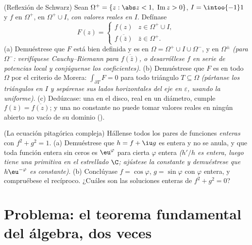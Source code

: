 \begin{exercise}[$\star\star\star$]\label{exo:b3:holomorphic:11}
(Reflexión de Schwarz) Sean $\Omega^+ = \{z : \abs z < 1,\
\operatorname{Im}z > 0\}$, $I = \intoo{-1}1$ y $f$
 en $\Omega^+$,
 en $\Omega^+\cup I$,
\emph{con valores reales en $I$}. Defínase
\[
F(z) = \begin{cases} f(z) & z \in \Omega^+\cup I,\\
\overline{f(\bar z)} & \bar z \in \Omega^+ . \end{cases}
\]
(a) Demuéstrese que $F$ está bien definida y es
 en
$\Omega = \Omega^+\cup I\cup\Omega^-$, y
 en $\Omega^\pm$ \emph{(para
$\Omega^-$: verifíquese Cauchy--Riemann para $\overline{f(\bar z)}$, o
desarróllese $f$ en serie de potencias local y conjúguense los
coeficientes)}. (b) Demuéstrese que $F$ es
 en todo $\Omega$ por el
criterio de Morera: $\int_{\partial T}F = 0$ para todo triángulo
$T \subseteq \Omega$ \emph{(pártanse los triángulos en $I$ y sepárense
sus lados horizontales del eje en $\varepsilon$, usando la
 uniforme)}. (c)
Dedúzcase: una  en el
disco, real en un diámetro, cumple $f(\bar z) = \overline{f(z)}$; y una
\omterm{def:b3:holomorphic:holo}{función holomorfa} no constante no
puede tomar valores reales en ningún abierto no vacío de su dominio
(\omterm{def:b3:topology:connected}{conexo}).
\end{exercise}

\begin{exercise}[$\star\star$]\label{exo:b3:holomorphic:12}
(La ecuación pitagórica compleja) Hállense todos los pares de funciones
\emph{enteras} con $f^2 + g^2 = 1$. (a) Demuéstrese que $h = f + \iu g$
es entera y no se anula, y que toda función entera sin ceros es
$\eu^{\varphi}$ para cierta $\varphi$ entera \emph{($h'/h$ es entera,
luego tiene una primitiva en el estrellado $\C$; ajústese la constante y
demuéstrese que $h\eu^{-\varphi}$ es constante)}. (b) Conclúyase
$f = \cos\varphi$, $g = \sin\varphi$ con $\varphi$ entera, y compruébese
el recíproco. ¿Cuáles son las soluciones enteras de $f^2 + g^2 = 0$?
\end{exercise}

\section{Problema: el teorema fundamental del álgebra, dos veces}

